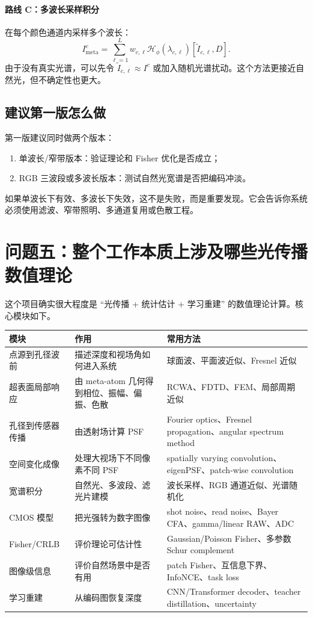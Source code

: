 \documentclass[11pt,a4paper,fontset=none]{ctexart}
\begin{document}
\paragraph{路线 C：多波长采样积分}
在每个颜色通道内采样多个波长：
\begin{equation}
  I_{\mathrm{meta}}^c
  =
  \sum_{\ell=1}^{L}
  w_{c,\ell}
  \mathcal H_\phi(\lambda_{c,\ell})[\tilde I_{c,\ell},D].
\end{equation}
由于没有真实光谱，可以先令 $\tilde I_{c,\ell}\approx I^c$ 或加入随机光谱扰动。这个方法更接近自然光，但不确定性也更大。

\subsection{建议第一版怎么做}

第一版建议同时做两个版本：
\begin{enumerate}
  \item 单波长/窄带版本：验证理论和 Fisher 优化是否成立；
  \item RGB 三波段或多波长版本：测试自然光宽谱是否把编码冲淡。
\end{enumerate}

如果单波长下有效、多波长下失效，这不是失败，而是重要发现。它会告诉你系统必须使用滤波、窄带照明、多通道复用或色散工程。

\section{问题五：整个工作本质上涉及哪些光传播数值理论}

这个项目确实很大程度是 ``光传播 + 统计估计 + 学习重建'' 的数值理论计算。核心模块如下。

\begin{longtable}{p{3.2cm}p{5.4cm}p{6.2cm}}
\toprule
模块 & 作用 & 常用方法 \\
\midrule
\endhead
点源到孔径波前 & 描述深度和视场角如何进入系统 & 球面波、平面波近似、Fresnel 近似 \\
\addlinespace
超表面局部响应 & 由 meta-atom 几何得到相位、振幅、偏振、色散 & RCWA、FDTD、FEM、局部周期近似 \\
\addlinespace
孔径到传感器传播 & 由透射场计算 PSF & Fourier optics、Fresnel propagation、angular spectrum method \\
\addlinespace
空间变化成像 & 处理大视场下不同像素不同 PSF & spatially varying convolution、eigenPSF、patch-wise convolution \\
\addlinespace
宽谱积分 & 自然光、多波段、滤光片建模 & 波长采样、RGB 通道近似、光谱随机化 \\
\addlinespace
CMOS 模型 & 把光强转为数字图像 & shot noise、read noise、Bayer CFA、gamma/linear RAW、ADC \\
\addlinespace
Fisher/CRLB & 评价理论可估计性 & Gaussian/Poisson Fisher、多参数 Schur complement \\
\addlinespace
图像级信息 & 评价自然场景中是否有用 & patch Fisher、互信息下界、InfoNCE、task loss \\
\addlinespace
学习重建 & 从编码图恢复深度 & CNN/Transformer decoder、teacher distillation、uncertainty \\
\bottomrule
\end{longtable}
\end{document}

